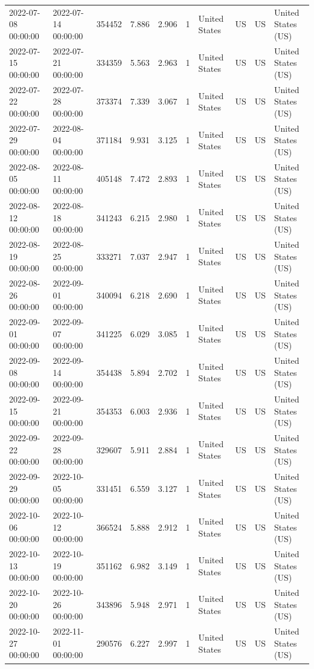 \begin{tabular}{llrrrlllll}
2022-07-08 00:00:00 & 2022-07-14 00:00:00 & 354452 & 7.886 & 2.906 & 1 & United States & US & US & United States (US) \\
2022-07-15 00:00:00 & 2022-07-21 00:00:00 & 334359 & 5.563 & 2.963 & 1 & United States & US & US & United States (US) \\
2022-07-22 00:00:00 & 2022-07-28 00:00:00 & 373374 & 7.339 & 3.067 & 1 & United States & US & US & United States (US) \\
2022-07-29 00:00:00 & 2022-08-04 00:00:00 & 371184 & 9.931 & 3.125 & 1 & United States & US & US & United States (US) \\
2022-08-05 00:00:00 & 2022-08-11 00:00:00 & 405148 & 7.472 & 2.893 & 1 & United States & US & US & United States (US) \\
2022-08-12 00:00:00 & 2022-08-18 00:00:00 & 341243 & 6.215 & 2.980 & 1 & United States & US & US & United States (US) \\
2022-08-19 00:00:00 & 2022-08-25 00:00:00 & 333271 & 7.037 & 2.947 & 1 & United States & US & US & United States (US) \\
2022-08-26 00:00:00 & 2022-09-01 00:00:00 & 340094 & 6.218 & 2.690 & 1 & United States & US & US & United States (US) \\
2022-09-01 00:00:00 & 2022-09-07 00:00:00 & 341225 & 6.029 & 3.085 & 1 & United States & US & US & United States (US) \\
2022-09-08 00:00:00 & 2022-09-14 00:00:00 & 354438 & 5.894 & 2.702 & 1 & United States & US & US & United States (US) \\
2022-09-15 00:00:00 & 2022-09-21 00:00:00 & 354353 & 6.003 & 2.936 & 1 & United States & US & US & United States (US) \\
2022-09-22 00:00:00 & 2022-09-28 00:00:00 & 329607 & 5.911 & 2.884 & 1 & United States & US & US & United States (US) \\
2022-09-29 00:00:00 & 2022-10-05 00:00:00 & 331451 & 6.559 & 3.127 & 1 & United States & US & US & United States (US) \\
2022-10-06 00:00:00 & 2022-10-12 00:00:00 & 366524 & 5.888 & 2.912 & 1 & United States & US & US & United States (US) \\
2022-10-13 00:00:00 & 2022-10-19 00:00:00 & 351162 & 6.982 & 3.149 & 1 & United States & US & US & United States (US) \\
2022-10-20 00:00:00 & 2022-10-26 00:00:00 & 343896 & 5.948 & 2.971 & 1 & United States & US & US & United States (US) \\
2022-10-27 00:00:00 & 2022-11-01 00:00:00 & 290576 & 6.227 & 2.997 & 1 & United States & US & US & United States (US) \\

\end{tabular}
